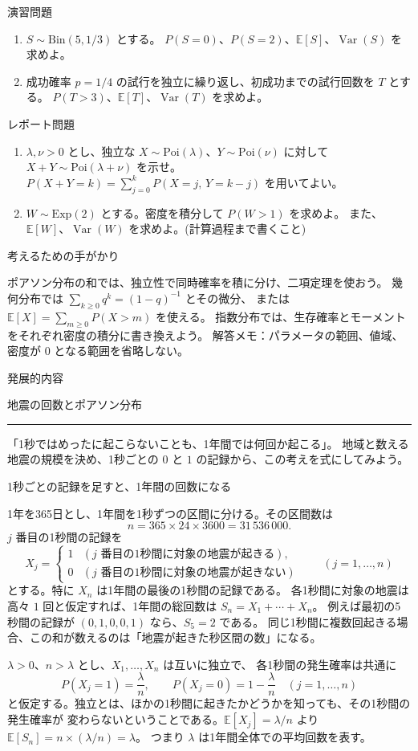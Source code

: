 \documentclass[a4paper,10pt,pdflatex,ja=standard,jafont=ipaex-type1,
  magstyle=real,scale=1]{bxjsarticle}
\newcommand{\coursename}{確率論と統計学 I}
\newcommand{\topic}[1]{\par\vspace{5pt}
  {\large\sffamily\mdseries\color{accent}#1}\par\vspace{2pt}}
\newcommand{\columnheading}[1]{\par\vspace{5pt}
  {\fontsize{11pt}{15pt}\selectfont\sffamily\mdseries\color{accent}#1}\par\vspace{2pt}}
\newcommand{\columnstart}[1]{\clearpage
  \setlength{\parskip}{2.5pt}
  \fancyhead[L]{\small\color{ink}\coursename{}・発展的内容}
  {\small\sffamily\mdseries\color{accent}発展的内容}\par\vspace{4pt}
  {\Large\color{ink}#1}\par\vspace{2pt}
  {\color{accent}\rule{\linewidth}{0.7pt}}\par\vspace{4pt}}
\newcommand{\E}{\mathbb E}
\newcommand{\Var}{\operatorname{Var}}
\begin{document}
\newpage
\topic{演習問題}
\begin{enumerate}[label=\arabic*.]
  \item $S\sim\mathrm{Bin}(5,1/3)$ とする。
  $P(S=0)$、$P(S=2)$、$\E[S]$、$\Var(S)$ を求めよ。
  \item 成功確率 $p=1/4$ の試行を独立に繰り返し、初成功までの試行回数を $T$ とする。
  $P(T>3)$、$\E[T]$、$\Var(T)$ を求めよ。
\end{enumerate}

\topic{レポート問題}
\begin{enumerate}[label=\arabic*.]
  \item $\lambda,\nu>0$ とし、独立な $X\sim\mathrm{Poi}(\lambda)$、$Y\sim\mathrm{Poi}(\nu)$ に対して
  $X+Y\sim\mathrm{Poi}(\lambda+\nu)$ を示せ。
  $P(X+Y=k)=\sum_{j=0}^kP(X=j,\,Y=k-j)$ を用いてよい。
    \item $W\sim\mathrm{Exp}(2)$ とする。密度を積分して $P(W>1)$ を求めよ。
  また、$\E[W]$、$\Var(W)$ を求めよ。(計算過程まで書くこと)
\end{enumerate}

\topic{考えるための手がかり}
ポアソン分布の和では、独立性で同時確率を積に分け、二項定理を使おう。
幾何分布では $\sum_{k\ge0}q^k=(1-q)^{-1}$ とその微分、
または $\E[X]=\sum_{m\ge0}P(X>m)$ を使える。
指数分布では、生存確率とモーメントをそれぞれ密度の積分に書き換えよう。
\vfill
{\small\color{muted}解答メモ：パラメータの範囲、値域、密度が $0$ となる範囲を省略しない。}

\columnstart{地震の回数とポアソン分布}
「1秒ではめったに起こらないことも、1年間では何回か起こる」。
地域と数える地震の規模を決め、1秒ごとの $0$ と $1$ の記録から、この考えを式にしてみよう。

\columnheading{1秒ごとの記録を足すと、1年間の回数になる}
1年を365日とし、1年間を1秒ずつの区間に分ける。その区間数は
$$n=365\times24\times3600=31\,536\,000.$$
$j$ 番目の1秒間の記録を
$$
  X_j=\begin{cases}
    1 & (j\text{ 番目の1秒間に対象の地震が起きる}),\\
    0 & (j\text{ 番目の1秒間に対象の地震が起きない})
  \end{cases}
  \qquad(j=1,\ldots,n)
$$
とする。特に $X_n$ は1年間の最後の1秒間の記録である。
各1秒間に対象の地震は高々 $1$ 回と仮定すれば、1年間の総回数は $S_n=X_1+\cdots+X_n$。
例えば最初の5秒間の記録が $(0,1,0,0,1)$ なら、$S_5=2$ である。
同じ1秒間に複数回起きる場合、この和が数えるのは「地震が起きた秒区間の数」になる。

$\lambda>0$、$n>\lambda$ とし、$X_1,\ldots,X_n$ は互いに独立で、
各1秒間の発生確率は共通に
$$
  P(X_j=1)=\frac{\lambda}{n},\qquad
  P(X_j=0)=1-\frac{\lambda}{n}\quad(j=1,\ldots,n)
$$
と仮定する。独立とは、ほかの1秒間に起きたかどうかを知っても、その1秒間の発生確率が
変わらないということである。$\E[X_j]=\lambda/n$ より
$\E[S_n]=n\times(\lambda/n)=\lambda$。
つまり $\lambda$ は1年間全体での平均回数を表す。
\end{document}
